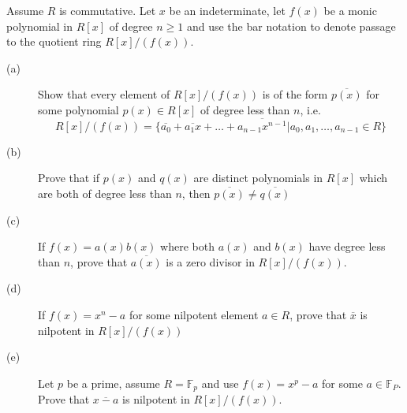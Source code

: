 \documentclass[12pt,leqno]{book}
\numberwithin{equation}{section}
\newcommand{\question}[2] {\vspace{.25in}\noindent\fbox{#1} #2 \vspace{.10in}}
\theoremstyle{definition}
\begin{document}
\question{14.}{Assume $R$ is commutative. Let $x$ be an indeterminate, let $f(x)$ be a monic polynomial in $R[x]$ of degree $n\geq1$ and use the bar notation to denote passage to the quotient ring $R[x]/(f(x))$.}
\begin{description}
 \item [(a)] Show that every element of $R[x]/(f(x))$ is of the form $\overline{p(x)}$ for some polynomial $p(x)\in R[x]$ of degree less than $n$, i.e.\[R[x]/(f(x))=\{\overline{a_0}+\overline{a_1x}+\hdots+\overline{a_{n-1}x^{n-1}}|a_0,a_1,\hdots,a_{n-1}\in R\}\]
 \item [(b)] Prove that if $p(x)$ and $q(x)$ are distinct polynomials in $R[x]$ which are both of degree less than $n$, then $\overline{p(x)}\not=\overline{q(x)}$
 \item [(c)] If $f(x)=a(x)b(x)$ where both $a(x)$ and $b(x)$ have degree less than $n$, prove that $\overline{a(x)}$ is a zero divisor in $R[x]/(f(x))$.
 \item [(d)] If $f(x)=x^n-a$ for some nilpotent element $a\in R$, prove that $\overline{x}$ is nilpotent in $R[x]/(f(x))$
 \item [(e)] Let $p$ be a prime, assume $R=\mathbb{F}_p$ and use $f(x)=x^p-a$ for some $a\in\mathbb{F}_P$. Prove that $\overline{x-a}$ is nilpotent in $R[x]/(f(x))$.
\end{description}
\end{document}
